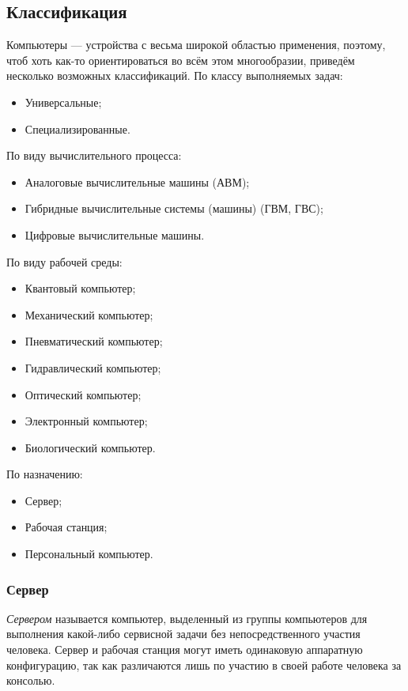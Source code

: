\subsection{Классификация}\label{base:introduction:computer:classification}
Компьютеры --- устройства с весьма широкой областью применения, поэтому, чтоб хоть как-то ориентироваться во всём этом многообразии, приведём несколько возможных классификаций.
По классу выполняемых задач:
\begin{itemize}
 \item Универсальные;
 \item Специализированные.
\end{itemize}
По виду вычислительного процесса:
\begin{itemize}
 \item Аналоговые вычислительные машины (АВМ);
 \item Гибридные вычислительные системы (машины) (ГВМ, ГВС);
 \item Цифровые вычислительные машины.
\end{itemize}
По виду рабочей среды:
\begin{itemize}
 \item Квантовый компьютер;
 \item Механический компьютер;
 \item Пневматический компьютер;
 \item Гидравлический компьютер;
 \item Оптический компьютер;
 \item Электронный компьютер;
 \item Биологический компьютер.
\end{itemize}
По назначению:
\begin{itemize}
 \item Сервер;
 \item Рабочая станция;
 \item Персональный компьютер.
\end{itemize}

\subsubsection{Сервер}\label{base:introduction:computer:classification:server}
\emph{Сервером} называется компьютер, выделенный из группы компьютеров для выполнения какой-либо сервисной задачи без непосредственного участия человека.
Сервер и рабочая станция могут иметь одинаковую аппаратную конфигурацию, так как различаются лишь по участию в своей работе человека за консолью.

